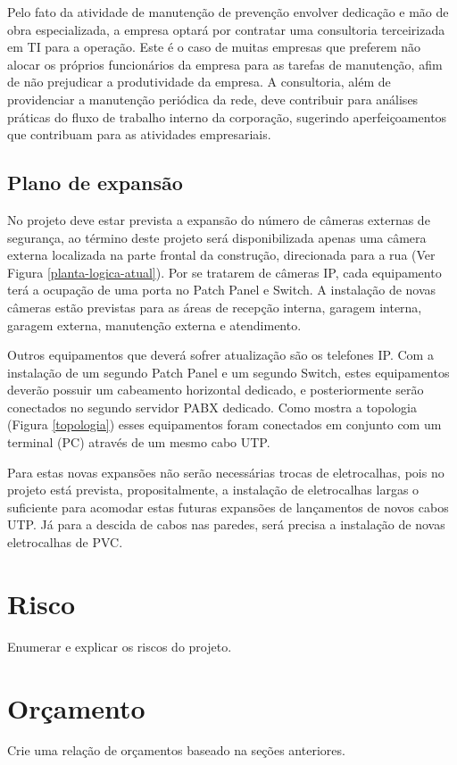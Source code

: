 \documentclass[	DIV=calc,%
							paper=a4,%
							fontsize=12pt,%
							onecolumn]{scrartcl}	 					%
\begin{document}
Pelo fato da atividade de manutenção de prevenção envolver dedicação e mão de obra especializada, a empresa optará por contratar uma consultoria terceirizada em TI para a operação. Este é o caso de muitas empresas que preferem não alocar os próprios funcionários da empresa para as tarefas de manutenção, afim de não prejudicar a produtividade da empresa. A consultoria, além de providenciar a manutenção periódica da rede, deve contribuir para análises práticas do fluxo de trabalho interno da corporação, sugerindo aperfeiçoamentos que contribuam para as atividades empresariais.

\subsection{Plano de expansão}

No projeto deve estar prevista a expansão do número de câmeras externas de segurança, ao término deste projeto será disponibilizada apenas uma câmera externa localizada na parte frontal da construção, direcionada para a rua (Ver Figura \ref{planta-logica-atual}). Por se tratarem de câmeras IP, cada equipamento terá a ocupação de uma porta no Patch Panel e Switch. A instalação de novas câmeras estão previstas para as áreas de recepção interna, garagem interna, garagem externa, manutenção externa e atendimento.

Outros equipamentos que deverá sofrer atualização são os telefones IP. Com a instalação de um segundo Patch Panel e um segundo Switch, estes equipamentos deverão possuir um cabeamento horizontal dedicado, e posteriormente serão conectados no segundo servidor PABX dedicado. Como mostra a topologia (Figura \ref{topologia}) esses equipamentos foram conectados em conjunto com um terminal (PC) através de um mesmo cabo UTP.

Para estas novas expansões não serão necessárias trocas de eletrocalhas, pois no projeto está prevista, propositalmente, a instalação de eletrocalhas largas o suficiente para acomodar estas futuras expansões de lançamentos de novos cabos UTP. Já para a descida de cabos nas paredes, será precisa a instalação de novas eletrocalhas de PVC.

\section{Risco}
Enumerar e explicar os riscos do projeto.

\section{Orçamento}
Crie uma relação de orçamentos baseado na seções anteriores.
\end{document}
